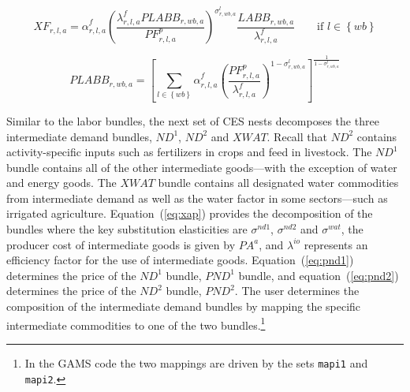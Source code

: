\documentclass[11pt,letterpaper]{report}
\begin{document}
\begin{equation}
\label{eq:labd}
\mathit{XF}_{r,l,a} =
   \displaystyle \alpha^{\mathit{f}}_{r,l,a}
      \left( \frac {\lambda^f_{r,l,a} \mathit{PLABB}_{r,\mathit{wb},a}}
         {\mathit{PF}^p_{r,l,a}}
      \right)^{\sigma^{\mathit{l}}_{r,\mathit{wb},a}}
      \frac {\mathit{LABB}_{r,\mathit{wb},a}} {\lambda^f_{r,l,a}}
   \qquad \textrm{if } l \in \left\{ \mathit{wb} \right\}
\end{equation}

\begin{equation}
\label{eq:plabb}
\mathit{PLABB}_{r,\mathit{wb},a} =
   \left[
      \sum_{l \in \left\{ \mathit{wb} \right\}}{
         \alpha^{\mathit{f}}_{r,\mathit{l},a}
         \left( \frac {\mathit{PF}^p_{r,\mathit{l},a}}
            {\lambda^{\mathit{f}}_{\mathit{r,\mathit{l},a}}}
         \right)^{1 - \sigma^{l}_{{r,\mathit{wb},a}}}
      }
   \right]^{\frac{1} {1 - \sigma^{l}_{{r,\mathit{wb},a}}}}
\end{equation}

Similar to the labor bundles, the next set of CES nests decomposes the three
intermediate demand bundles, $\mathit{ND}^1$, $\mathit{ND}^2$ and
$\mathit{XWAT}$. Recall that $\mathit{ND}^2$ contains activity-specific inputs
such as fertilizers in crops and feed in livestock. The $\mathit{ND}^1$ bundle
contains all of the other intermediate goods---with the exception of water and
energy goods. The $\mathit{XWAT}$ bundle contains all designated water
commodities from intermediate demand as well as the water factor in some
sectors---such as irrigated agriculture. Equation~(\ref{eq:xap}) provides the
decomposition of the bundles where the key substitution elasticities are
$\sigma^{\mathit{nd1}}$, $\sigma^{\mathit{nd2}}$ and $\sigma^{\mathit{wat}}$,
the producer cost of intermediate goods is given by $\mathit{PA}^a$,
and $\lambda^{\mathit{io}}$ represents an efficiency factor for the use of
intermediate goods. Equation~(\ref{eq:pnd1}) determines the price of the
$\mathit{ND}^1$ bundle, $\mathit{PND}^1$ bundle, and equation~(\ref{eq:pnd2})
determines the price of the $\mathit{ND}^2$ bundle, $\mathit{PND}^2$. The user
determines the composition of the intermediate demand bundles by mapping the
specific intermediate commodities to one of the two bundles.\footnote{In the
{GAMS} code the two mappings are driven by the sets \texttt{mapi1} and
\texttt{mapi2}.}
\end{document}
